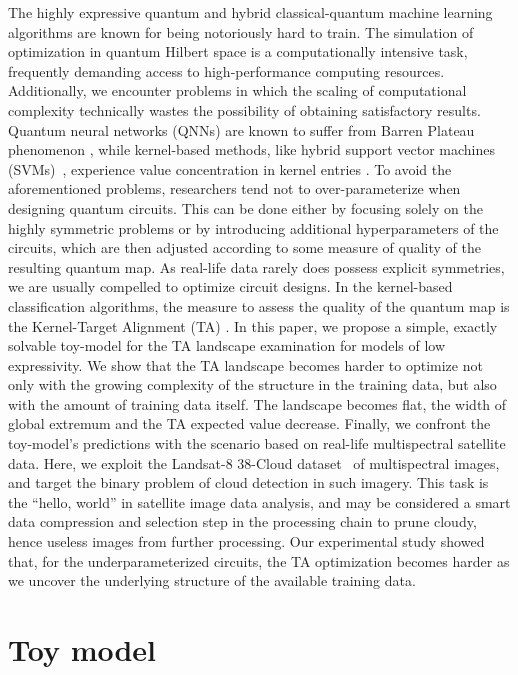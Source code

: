 \documentclass{article}
\begin{document}
The highly expressive quantum and hybrid classical-quantum machine learning algorithms are known for being notoriously hard to train. 
The simulation of optimization in quantum Hilbert space is a computationally intensive task, frequently demanding access to high-performance computing resources. Additionally, we encounter problems in which the scaling of computational complexity technically wastes the possibility of obtaining satisfactory results.
Quantum neural networks (QNNs) are known to suffer from Barren Plateau phenomenon \cite{mcclean2018barren}, while kernel-based methods, like hybrid support vector machines (SVMs)~\cite{9554802,electronics10202482}, experience value concentration in kernel entries \cite{thanasilp2022exponential}.
To avoid the aforementioned problems, researchers tend not to over-parameterize when designing quantum circuits. 
This can be done either by focusing solely on the highly symmetric problems or by introducing additional hyperparameters of the circuits, which are then adjusted according to some measure of quality of the resulting quantum map.
As real-life data rarely does possess explicit symmetries, we are usually compelled to optimize circuit designs.
In the kernel-based classification algorithms, the measure to assess the quality of the quantum map is the Kernel-Target Alignment (TA) \cite{cristianini2001kernel, hubregtsen2022training}.
In this paper, we propose a simple, exactly solvable toy-model for the TA landscape examination for models of low expressivity. We show that the TA landscape becomes harder to optimize not only with the growing complexity of the structure in the training data, but also with the amount of training data itself. The landscape becomes flat, the width of global extremum and the TA expected value decrease.
Finally, we confront the toy-model's predictions with the scenario based on real-life multispectral satellite data. Here, we exploit the Landsat-8 38-Cloud dataset~\cite{38-cloud-1, 38-cloud-2} of multispectral images, and target the binary problem of cloud detection in such imagery. This task is the ``hello, world'' in satellite image data analysis, and may be considered a smart data compression and selection step in the processing chain to prune cloudy, hence useless images from further processing. Our experimental study showed that, for the underparameterized circuits, the TA optimization becomes harder as we uncover the underlying structure of the available training data. 

\section{Toy model}
\end{document}
